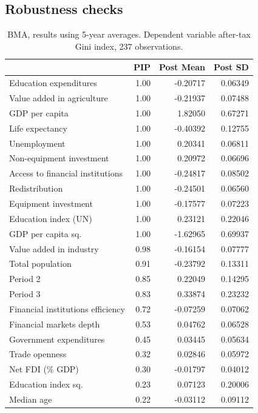\begin{refsection}
\begin{subappendices}
\section{Robustness checks}
\begin{table}[ht!]
  \centering
  \small
  \caption{BMA, results using 5-year averages. Dependent variable after-tax Gini index, 237 observations.}\label{ch4res:5y_gini}
  \begin{tabular}{lrrr}
    \toprule
   & PIP & Post Mean & Post SD \\
    \midrule
    Education expenditures & 1.00 & -0.20717 & 0.06349 \\
    Value added in agriculture & 1.00 & -0.21937 & 0.07488 \\ 
    GDP per capita & 1.00 & 1.82050 & 0.67271 \\ 
    Life expectancy & 1.00 & -0.40392 & 0.12755 \\ 
    Unemployment & 1.00 & 0.20341 & 0.06811 \\
    Non-equipment investment & 1.00 & 0.20972 & 0.06696 \\ 
    Access to financial institutions & 1.00 & -0.24817 & 0.08502 \\ 
    Redistribution & 1.00 & -0.24501 & 0.06560 \\ 
    Equipment investment & 1.00 & -0.17577 & 0.07223 \\ 
    Education index (UN) & 1.00 & 0.23121 & 0.22046 \\ 
    GDP per capita sq. & 1.00 & -1.62965 & 0.69937 \\
    Value added in industry & 0.98 & -0.16154 & 0.07777 \\ 
    Total population & 0.91 & -0.23792 & 0.13311 \\ 
    Period 2 & 0.85 & 0.22049 & 0.14295 \\ 
    Period 3 & 0.83 & 0.33874 & 0.23232 \\
    Financial institutions efficiency & 0.72 & -0.07259 & 0.07062 \\ 
    Financial markets depth & 0.53 & 0.04762 & 0.06528 \\
    Government expenditures & 0.45 & 0.03445 & 0.05634 \\ 
    Trade openness & 0.32 & 0.02846 & 0.05972 \\
    Net FDI (\% GDP) & 0.30 & -0.01797 & 0.04012 \\ 
    Education index sq. & 0.23 & 0.07123 & 0.20006 \\ 
    Median age & 0.22 & -0.03112 & 0.09112 \\ 

\end{tabular}
\end{table}
\end{subappendices}
\end{refsection}

